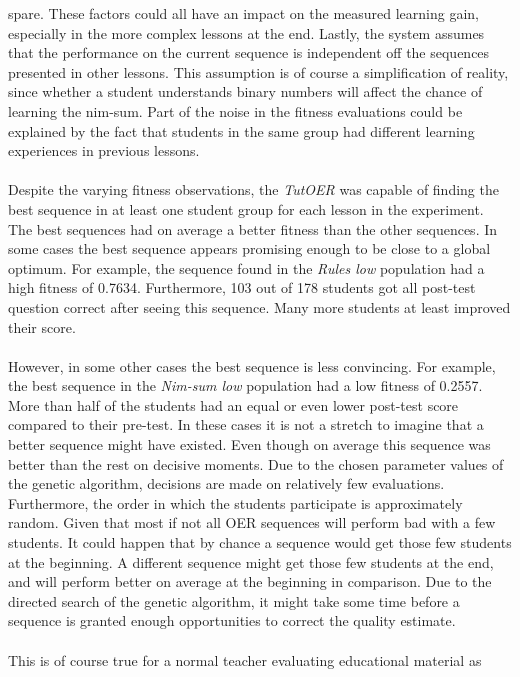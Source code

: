 spare. These factors could all have an impact on the measured learning gain,
especially in the more complex lessons at the end. Lastly, the system assumes
that the performance on the current sequence is independent off the sequences
presented in other lessons. This assumption is of course a simplification of
reality, since whether a student understands binary numbers will affect the
chance of learning the nim-sum. Part of the noise in the fitness evaluations
could be explained by the fact that students in the same group had different
learning experiences in previous lessons.\\\\
\noindent
Despite the varying fitness observations, the \emph{TutOER} was capable of
finding the best sequence in at least one student group for each lesson in the
experiment. The best sequences had on average a better fitness than the other
sequences. In some cases the best sequence appears promising enough to be close
to a global optimum. For example, the sequence found in the \emph{Rules low}
population had a high fitness of 0.7634. Furthermore, 103 out of 178 students
got all post-test question correct after seeing this sequence. Many more
students at least improved their score.\\\\
\noindent
However, in some other cases the best sequence is less convincing. For example,
the best sequence in the \emph{Nim-sum low} population had a low fitness of
0.2557. More than half of the students had an equal or even lower post-test
score compared to their pre-test. In these cases it is not a stretch to imagine
that a better sequence might have existed. Even though on average this sequence
was better than the rest on decisive moments. Due to the chosen parameter
values of the genetic algorithm, decisions are made on relatively few
evaluations. Furthermore, the order in which the students participate is
approximately random. Given that most if not all OER sequences will perform bad
with a few students. It could happen that by chance a sequence would get those
few students at the beginning. A different sequence might get those few
students at the end, and will perform better on average at the beginning in
comparison. Due to the directed search of the genetic algorithm, it might take
some time before a sequence is granted enough opportunities to correct the
quality estimate.\\\\
\noindent
This is of course true for a normal teacher evaluating educational material as
